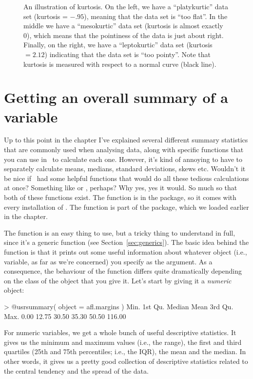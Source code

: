 \begin{figure}[t]
\begin{center}
\caption{An illustration of kurtosis. On the left, we have a ``platykurtic'' data set (kurtosis = $-.95$), meaning that the data set is ``too flat''. In the middle we have a ``mesokurtic'' data set (kurtosis is almost exactly 0), which means that the pointiness of the data is just about right. Finally, on the right, we have a ``leptokurtic'' data set (kurtosis $= 2.12$) indicating that the data set is ``too pointy''. Note that kurtosis is measured with respect to a normal curve (black line).}
\label{fig:kurtosis}
\HR
\end{center}
\end{figure}

\section{Getting an overall summary of a variable~\label{sec:summary}}

Up to this point in the chapter I've explained several different summary statistics that are commonly used when analysing data, along with specific functions that you can use in \R\ to calculate each one. However, it's kind of annoying to have to separately calculate means, medians, standard deviations, skews etc. Wouldn't it be nice if \R\ had some helpful functions that would do all these tedious calculations at once? Something like  or , perhaps? Why yes, yes it would. So much so that both of these functions exist. The  function is in the  package, so it comes with every installation of \R. The  function is part of the  package, which we loaded earlier in the chapter.




The  function is an easy thing to use, but a tricky thing to understand in full, since it's a generic function (see Section~\ref{sec:generics}). The basic idea behind the  function is that it prints out some useful information about whatever object (i.e., variable, as far as we're concerned) you specify as the  argument. As a consequence, the behaviour of the  function differs quite dramatically depending on the class of the object that you give it. Let's start by giving it a {\it numeric} object:
\begin{rblock1}
> @usr{summary( object = afl.margins )}  
   Min. 1st Qu.  Median    Mean 3rd Qu.    Max. 
   0.00   12.75   30.50   35.30   50.50  116.00 
\end{rblock1}
For numeric variables, we get a whole bunch of useful descriptive statistics. It gives us the minimum and maximum values (i.e., the range), the first and third quartiles (25th and 75th percentiles; i.e., the IQR), the mean and the median. In other words, it gives us a pretty good collection of descriptive statistics related to the central tendency and the spread of the data.

